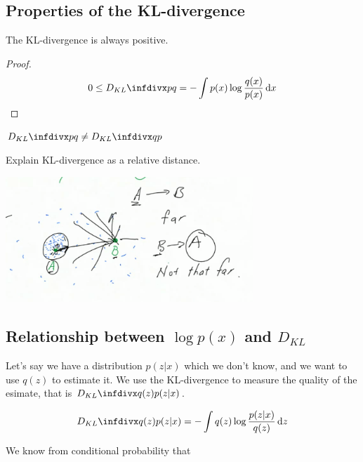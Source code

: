 \subsection{Properties of the KL-divergence}

\begin{thm}
The KL-divergence is always positive.
\end{thm}

\begin{proof}
    \begin{align}
        0 \leq \kldiv{p}{q} = - \int p(x) \log \frac{q(x)}{p(x)} \dx
    \end{align}
\end{proof}

\begin{thm}
$\kldiv{p}{q} \neq \kldiv{q}{p}$
\end{thm}


\begin{tcolorbox}
Explain KL-divergence as a relative distance. 

\includegraphics[width=0.7\textwidth]{img/kldivergence-relative}
\end{tcolorbox}



\subsection{Relationship between $\log p(x)$ and $D_{KL}$}

Let's say we have a distribution $p(z | x)$ which we don't know, and we want to use $q(z)$ to estimate it. We use the KL-divergence to measure the quality of the esimate, that is $\kldiv{q(z)}{p(z|x)}$.

\begin{align}
    \label{eq:kldiv}
    \kldiv{q(z)}{p(z|x)} = - \int q(z) \log \frac{p(z|x)}{q(z)} \dz
\end{align}

We know from conditional probability that

